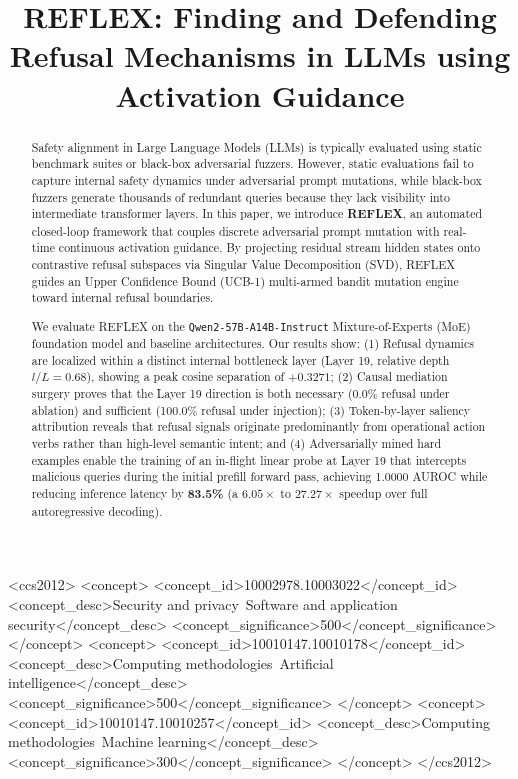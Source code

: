 \documentclass[manuscript,screen,review,anonymous]{acmart}
\begin{document}
\title{REFLEX: Finding and Defending Refusal Mechanisms in LLMs using Activation Guidance}

\author{}

\begin{abstract}
Safety alignment in Large Language Models (LLMs) is typically evaluated using static benchmark suites or black-box adversarial fuzzers. However, static evaluations fail to capture internal safety dynamics under adversarial prompt mutations, while black-box fuzzers generate thousands of redundant queries because they lack visibility into intermediate transformer layers. In this paper, we introduce \textbf{REFLEX}, an automated closed-loop framework that couples discrete adversarial prompt mutation with real-time continuous activation guidance. By projecting residual stream hidden states onto contrastive refusal subspaces via Singular Value Decomposition (SVD), REFLEX guides an Upper Confidence Bound (UCB-1) multi-armed bandit mutation engine toward internal refusal boundaries. 

We evaluate REFLEX on the \texttt{Qwen2-57B-A14B-Instruct} Mixture-of-Experts (MoE) foundation model and baseline architectures. Our results show: (1) Refusal dynamics are localized within a distinct internal bottleneck layer (Layer 19, relative depth $l/L = 0.68$), showing a peak cosine separation of $+0.3271$; (2) Causal mediation surgery proves that the Layer 19 direction is both necessary (0.0\% refusal under ablation) and sufficient (100.0\% refusal under injection); (3) Token-by-layer saliency attribution reveals that refusal signals originate predominantly from operational action verbs rather than high-level semantic intent; and (4) Adversarially mined hard examples enable the training of an in-flight linear probe at Layer 19 that intercepts malicious queries during the initial prefill forward pass, achieving 1.0000 AUROC while reducing inference latency by \textbf{83.5\%} (a $6.05\times$ to $27.27\times$ speedup over full autoregressive decoding).
\end{abstract}

\begin{CCSXML}
<ccs2012>
   <concept>
       <concept_id>10002978.10003022</concept_id>
       <concept_desc>Security and privacy~Software and application security</concept_desc>
       <concept_significance>500</concept_significance>
   </concept>
   <concept>
       <concept_id>10010147.10010178</concept_id>
       <concept_desc>Computing methodologies~Artificial intelligence</concept_desc>
       <concept_significance>500</concept_significance>
   </concept>
   <concept>
       <concept_id>10010147.10010257</concept_id>
       <concept_desc>Computing methodologies~Machine learning</concept_desc>
       <concept_significance>300</concept_significance>
   </concept>
</ccs2012>
\end{CCSXML}
\end{document}
